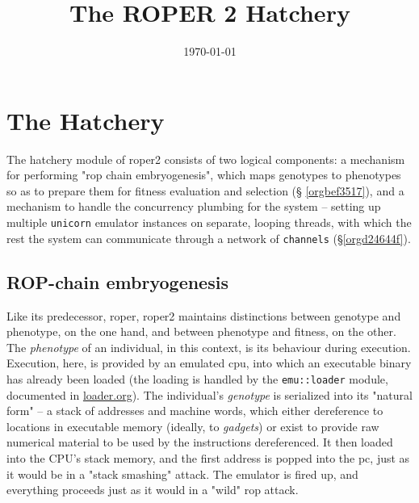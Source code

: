 \documentclass[11pt]{article}
\date{\today}
\title{The ROPER 2 Hatchery}
\begin{document}
\maketitle
\tableofcontents


\section{The Hatchery}
\label{sec:org6d7f60c}

The hatchery module of \gls{roper2} consists of two logical components: a
mechanism for performing "\gls{rop} chain embryogenesis", which maps genotypes to
phenotypes so as to prepare them for fitness evaluation and selection (\S
\ref{orgbef3517}), and a mechanism to handle the concurrency plumbing for the
system -- setting up multiple \texttt{unicorn} emulator instances on separate, looping
threads, with which the rest the system can communicate through a network of
\texttt{channels} (\S \ref{orgd24644f}). 

\subsection{ROP-chain embryogenesis}
\label{sec:orgc7506e4}
\label{orgbef3517}

Like its predecessor, \gls{roper}, \gls{roper2} maintains distinctions between
genotype and phenotype, on the one hand, and between phenotype and fitness,
on the other. The \emph{phenotype} of an individual, in this context, is its
behaviour during execution. Execution, here, is provided by an emulated
\gls{cpu}, into which an executable binary has already been loaded (the
loading is handled by the \texttt{emu::loader} module, documented in \url{loader.org}).
The individual's \emph{genotype} is serialized into its "natural form" -- a
stack of addresses and machine words, which either dereference to locations
in executable memory (ideally, to \emph{gadgets}) or exist to provide raw numerical
material to be used by the instructions dereferenced. It then loaded into
the CPU's stack memory, and the first address is popped into the \gls{pc}, 
just as it would be in a "stack smashing" attack. The emulator is fired up,
and everything proceeds just as it would in a "wild" \gls{rop} attack.  
\end{document}
